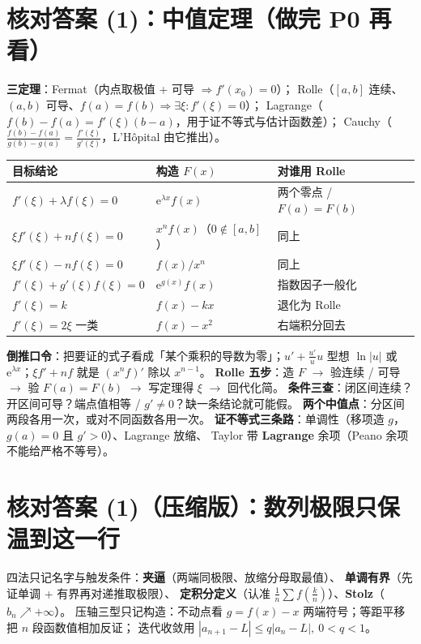 \documentclass[10pt,a4paper]{ctexart}
\newcommand{\abs}[1]{\left\lvert #1\right\rvert}
\newcommand{\ee}{\mathrm{e}}
\begin{document}
\section*{核对答案 (1)：中值定理（做完 P0 再看）}
\textbf{三定理}：Fermat（内点取极值 + 可导 $\Rightarrow f'(x_0)=0$）；
Rolle（$[a,b]$ 连续、$(a,b)$ 可导、$f(a)=f(b)\Rightarrow\exists\xi:f'(\xi)=0$）；
Lagrange（$f(b)-f(a)=f'(\xi)(b-a)$，用于证不等式与估计函数差）；
Cauchy（$\frac{f(b)-f(a)}{g(b)-g(a)}=\frac{f'(\xi)}{g'(\xi)}$，L'Hôpital 由它推出）。
\small\setlength{\tabcolsep}{4pt}
\begin{tabularx}{\linewidth}{p{4.6cm}|p{4.4cm}|X}
\toprule
目标结论 & 构造 $F(x)$ & 对谁用 Rolle \\
\midrule
$f'(\xi)+\lambda f(\xi)=0$ & $\ee^{\lambda x}f(x)$ & 两个零点 /
$F(a)=F(b)$ \\
$\xi f'(\xi)+n f(\xi)=0$ & $x^n f(x)$（$0\notin[a,b]$） & 同上 \\
$\xi f'(\xi)-n f(\xi)=0$ & $f(x)/x^n$ & 同上 \\
$f'(\xi)+g'(\xi)f(\xi)=0$ & $\ee^{g(x)}f(x)$ & 指数因子一般化 \\
$f'(\xi)=k$ & $f(x)-kx$ & 退化为 Rolle \\
$f'(\xi)=2\xi$ 一类 & $f(x)-x^2$ & 右端积分回去 \\
\bottomrule
\end{tabularx}
\normalsize\smallskip
\textbf{倒推口令}：把要证的式子看成「某个乘积的导数为零」；$u'+\frac{u'}u u$ 型想 $\ln\abs u$
或 $\ee^{\lambda x}$；$\xi f'+nf$ 就是 $(x^n f)'$ 除以 $x^{n-1}$。
\textbf{Rolle 五步}：造 $F$ $\to$ 验连续 / 可导 $\to$ 验 $F(a)=F(b)$ $\to$ 写定理得 $\xi$ $\to$
回代化简。
\textbf{条件三查}：闭区间连续？开区间可导？端点值相等 / $g'\ne0$？缺一条结论就可能假。
\textbf{两个中值点}：分区间两段各用一次，或对不同函数各用一次。
\textbf{证不等式三条路}：单调性（移项造 $g$，$g(a)=0$ 且 $g'>0$）、Lagrange 放缩、
Taylor 带 \textbf{Lagrange} 余项（Peano 余项不能给严格不等号）。

\section*{核对答案 (1)（压缩版）：数列极限只保温到这一行}
四法只记名字与触发条件：\textbf{夹逼}（两端同极限、放缩分母取最值）、
\textbf{单调有界}（先证单调 + 有界再对递推取极限）、
\textbf{定积分定义}（认准 $\frac1n\sum f(\frac kn)$）、\textbf{Stolz}（$b_n\nearrow+\infty$）。
压轴三型只记构造：不动点看 $g=f(x)-x$ 两端符号；等距平移把 $n$ 段函数值相加反证；
迭代收敛用 $\abs{a_{n+1}-L}\le q\abs{a_n-L},\ 0<q<1$。
\end{document}
